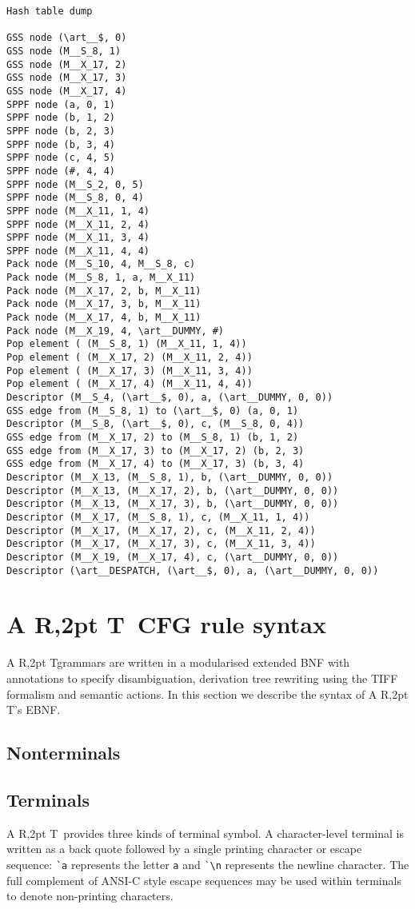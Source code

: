 \documentclass[11pt]{article}
\newenvironment{codebox}{\par\noindent\scriptsize\begin{boxedminipage}[t]{\textwidth}\vspace*{1ex}\par}{\end{boxedminipage}\par\vspace*{1ex}\par\noindent}
\newcommand{\art}{{\rm A\kern -2pt R\kern -2,2pt T}}
\begin{document}
\begin{codebox}
\begin{verbatim}
Hash table dump

GSS node (\art__$, 0)
GSS node (M__S_8, 1)
GSS node (M__X_17, 2)
GSS node (M__X_17, 3)
GSS node (M__X_17, 4)
SPPF node (a, 0, 1)
SPPF node (b, 1, 2)
SPPF node (b, 2, 3)
SPPF node (b, 3, 4)
SPPF node (c, 4, 5)
SPPF node (#, 4, 4)
SPPF node (M__S_2, 0, 5)
SPPF node (M__S_8, 0, 4)
SPPF node (M__X_11, 1, 4)
SPPF node (M__X_11, 2, 4)
SPPF node (M__X_11, 3, 4)
SPPF node (M__X_11, 4, 4)
Pack node (M__S_10, 4, M__S_8, c)
Pack node (M__S_8, 1, a, M__X_11)
Pack node (M__X_17, 2, b, M__X_11)
Pack node (M__X_17, 3, b, M__X_11)
Pack node (M__X_17, 4, b, M__X_11)
Pack node (M__X_19, 4, \art__DUMMY, #)
Pop element ( (M__S_8, 1) (M__X_11, 1, 4))
Pop element ( (M__X_17, 2) (M__X_11, 2, 4))
Pop element ( (M__X_17, 3) (M__X_11, 3, 4))
Pop element ( (M__X_17, 4) (M__X_11, 4, 4))
Descriptor (M__S_4, (\art__$, 0), a, (\art__DUMMY, 0, 0))
GSS edge from (M__S_8, 1) to (\art__$, 0) (a, 0, 1)
Descriptor (M__S_8, (\art__$, 0), c, (M__S_8, 0, 4))
GSS edge from (M__X_17, 2) to (M__S_8, 1) (b, 1, 2)
GSS edge from (M__X_17, 3) to (M__X_17, 2) (b, 2, 3)
GSS edge from (M__X_17, 4) to (M__X_17, 3) (b, 3, 4)
Descriptor (M__X_13, (M__S_8, 1), b, (\art__DUMMY, 0, 0))
Descriptor (M__X_13, (M__X_17, 2), b, (\art__DUMMY, 0, 0))
Descriptor (M__X_13, (M__X_17, 3), b, (\art__DUMMY, 0, 0))
Descriptor (M__X_17, (M__S_8, 1), c, (M__X_11, 1, 4))
Descriptor (M__X_17, (M__X_17, 2), c, (M__X_11, 2, 4))
Descriptor (M__X_17, (M__X_17, 3), c, (M__X_11, 3, 4))
Descriptor (M__X_19, (M__X_17, 4), c, (\art__DUMMY, 0, 0))
Descriptor (\art__DESPATCH, (\art__$, 0), a, (\art__DUMMY, 0, 0))
\end{verbatim}
\end{codebox}

\section{\art\ CFG rule syntax}
\label{rules}
\art grammars are written in a modularised extended BNF with
annotations to specify disambiguation, derivation tree rewriting using
the TIFF formalism and semantic actions. In this section we describe
the syntax of \art's EBNF.

\subsection{Nonterminals}


\subsection{Terminals}
\art\ provides three kinds of terminal symbol. A character-level
terminal is written as a back quote followed by a single printing
character or escape sequence: \verb+`a+ represents the letter {\tt a}
and \verb+`\n+ represents the newline character. The full complement
of ANSI-C style escape sequences may be used within terminals to
denote non-printing characters.
\end{document}
